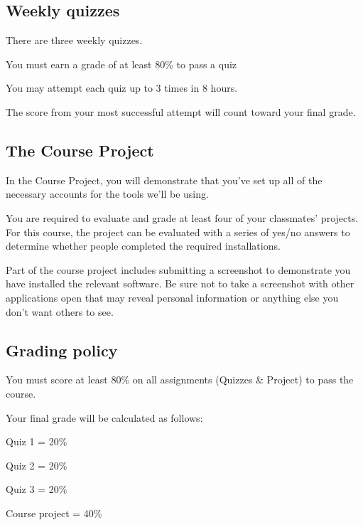 \subsection*{Weekly quizzes}

\begin{nitemize}
\item    There are three weekly quizzes.
\item    You must earn a grade of at least 80\% to pass a quiz
\item    You may attempt each quiz up to 3 times in 8 hours.
\item    The score from your most successful attempt will count toward your final grade.
\end{nitemize}


\subsection*{The Course Project}

In the Course Project, you will demonstrate that you've set up all of the necessary accounts for the tools we'll be using.

You are required to evaluate and grade at least four of your classmates' projects. For this course, the project can be evaluated with a series of yes/no answers to determine whether people completed the required installations.

Part of the course project includes submitting a screenshot to demonstrate you have installed the relevant software. Be sure not to take a screenshot with other applications open that may reveal personal information or anything else you don't want others to see.


\subsection*{Grading policy}

You must score at least 80\% on all assignments (Quizzes \& Project) to pass the course.

Your final grade will be calculated as follows:

\begin{nitemize}
\item    Quiz 1 = 20\%
\item    Quiz 2 = 20\%
\item    Quiz 3 = 20\%
\item    Course project = 40\%
\end{nitemize}


